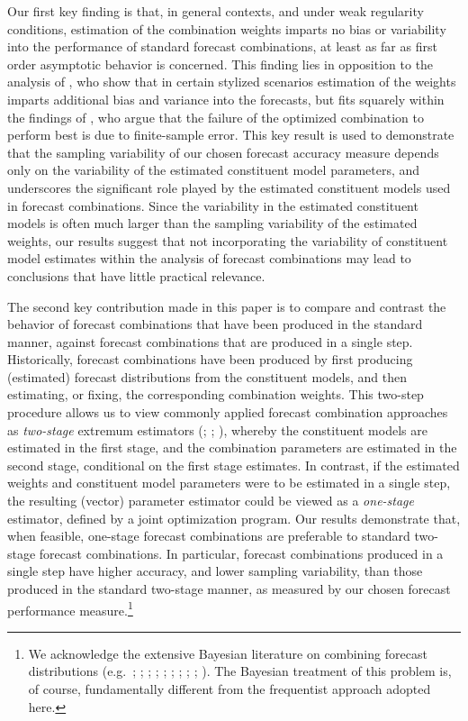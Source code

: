 \documentclass[12pt]{article}
\theoremstyle{definition}
\theoremstyle{remark}
\begin{document}
{Our first key finding is that, in general contexts, and under weak regularity conditions, estimation of the combination weights imparts no bias or variability into the performance of standard forecast combinations, at least as far as first order asymptotic behavior is concerned. This finding lies in opposition to the analysis of \cite{Claeskens2016}, who show that in certain stylized scenarios estimation of the weights imparts additional bias and variance into the forecasts, but fits squarely within the findings of \cite{Smith2009}, who argue that the {failure of the optimized combination to perform best} is due to finite-sample error. This key result is used to demonstrate that the sampling variability of our chosen forecast accuracy measure depends only on the variability of the estimated constituent model parameters, and underscores the significant role played by the estimated constituent models used in forecast combinations. Since the variability in the estimated constituent models is often much larger than the sampling variability of the estimated weights, our results suggest that not incorporating the variability of constituent model estimates within the analysis of forecast combinations may lead to conclusions that have little practical relevance.

The second key contribution made in this paper is to compare and contrast the behavior of forecast combinations that have been produced in the standard manner, against forecast combinations that are produced in a single step. Historically, forecast combinations have been produced by first producing (estimated) forecast distributions from the constituent models, and then estimating, or fixing, the corresponding combination weights. This two-step procedure allows us to view commonly applied forecast combination approaches as \textit{two-stage} extremum estimators (\citealp{Pagan1986}; \citealp{Newey1994}; \citealp{Frazier2017}), whereby the constituent models are estimated in the first stage, and the combination parameters are estimated in the second stage, conditional on the first stage estimates. In contrast, if the estimated weights and constituent model parameters were to be estimated in a single step, the resulting (vector) parameter estimator could be viewed as a \textit{one-stage} estimator, defined by a joint optimization program. Our results demonstrate that, when feasible, one-stage forecast combinations are preferable to standard two-stage forecast combinations. In particular, forecast combinations produced in a single step have higher accuracy, and lower sampling variability, than those produced in the standard two-stage manner, as measured by our chosen forecast performance measure.\footnote{\scriptsize We acknowledge the extensive Bayesian literature on combining forecast distributions (e.g.\ \citealp{Billio2013}; \citealp{Casarin2015}; \citealp{Casarin2016}; \citealp{Pettenuzzo2016}; \citealp{Aastveit2018}; \citealp{Bassetti2018}; \citealp{Bastuerk2019}; \citealp{Casarin2019}; \citealp{McAlinn2019}; \citealp{Loaiza-Maya2021}). The Bayesian treatment of this problem is, of course, fundamentally different from the frequentist approach adopted here.}

}
\end{document}
